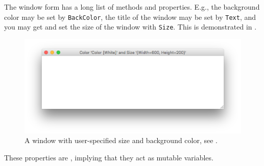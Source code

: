 \documentclass[fsharpNotes.tex]{subfiles}
\begin{document}
The window form has a long list of methods and properties. E.g., the background color may be set by \lstinline!BackColor!, the title of the window may be set by \lstinline!Text!, and you may get and set the size of the window with \lstinline!Size!. This is demonstrated in .
%
%
\begin{figure}
  \centering
  \includegraphics[scale=0.2]{windowProperty}
  \caption{A window with user-specified size and background color, see .}
  \label{fig:windowProperty}
\end{figure}
%
These properties are , implying that they act as mutable variables. 
\end{document}
